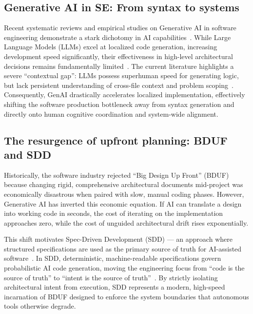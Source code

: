 \documentclass[conference]{IEEEtran}
\begin{document}
\subsection{Generative AI in SE: From syntax to systems}
Recent systematic reviews and empirical studies on Generative AI in software engineering 
demonstrate a stark dichotomy in AI capabilities~\cite{nguyenduc2026systematic,ieee2025transforming}. 
While Large Language Models (LLMs) excel at localized code generation, 
increasing development speed significantly, their effectiveness in high-level 
architectural decisions remains fundamentally limited~\cite{ieee2025transforming}. 
The current literature highlights a severe ``contextual gap'': LLMs possess superhuman 
speed for generating logic, but lack persistent understanding of cross-file context 
and problem scoping~\cite{cambridge2026contextual}. Consequently, GenAI drastically 
accelerates localized implementation, effectively shifting the software production 
bottleneck away from syntax generation and directly onto human cognitive coordination 
and system-wide alignment.

\subsection{The resurgence of upfront planning: BDUF and SDD}
Historically, the software industry rejected ``Big Design Up Front'' (BDUF) because 
changing rigid, comprehensive architectural documents mid-project was economically 
disastrous when paired with slow, manual coding phases. However, Generative AI has 
inverted this economic equation. If AI can translate a design into working code in 
seconds, the cost of iterating on the implementation approaches zero, while the cost 
of unguided architectural drift rises exponentially. 

This shift motivates Spec-Driven Development (SDD) --- an approach where structured 
specifications are used as the primary source of truth for AI-assisted 
software~\cite{thoughtworks202Xspec}. In SDD, deterministic, machine-readable 
specifications govern probabilistic AI code generation, moving the engineering focus 
from ``code is the source of truth'' to ``intent is the source of truth''~\cite{github2025spec}. 
By strictly isolating architectural intent from execution, SDD represents a modern, 
high-speed incarnation of BDUF designed to enforce the system boundaries that 
autonomous tools otherwise degrade.
\end{document}
